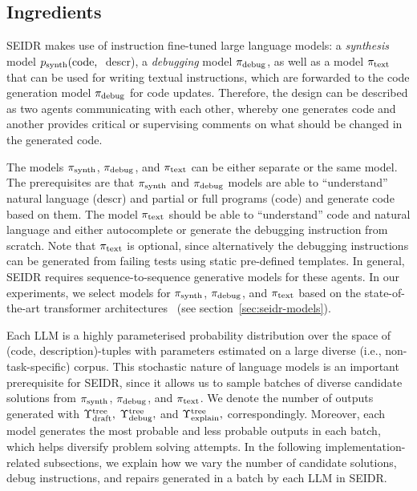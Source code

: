\newpage\subsection{Ingredients}
\label{sec:seidr-ingredients}

SEIDR makes use of instruction fine-tuned large language models: a \emph{synthesis} model $p_{\text{synth}}(\text{code, }$ descr), a \emph{debugging} model $ \pi_\text{debug} $, as well as a model $ \pi_\text{text} $ that can be used for writing textual instructions, which are forwarded to the code generation model $ \pi_\text{debug} $ for code updates. 
Therefore, the design can be described as two agents communicating with each other, whereby one generates code and another provides critical or supervising comments on what should be changed in the generated code. 

The models $ \pi_\text{synth} $, $ \pi_\text{debug} $, and $ \pi_\text{text} $ can be either separate or the same model.
The prerequisites are that $ \pi_\text{synth} $ and $ \pi_\text{debug} $ models are able to ``understand'' natural language (descr) and partial or full programs (code) and generate code based on them. 
The model $ \pi_\text{text} $ should be able to ``understand'' code and natural language and either autocomplete or generate the debugging instruction from scratch. 
Note that $ \pi_\text{text} $ is optional, since alternatively the debugging instructions can be generated from failing tests using static pre-defined templates.
In general, SEIDR requires sequence-to-sequence generative models for these agents. 
In our experiments, we select models for $ \pi_\text{synth} $, $ \pi_\text{debug} $, and $ \pi_\text{text} $ based on the state-of-the-art transformer architectures~\cite{vaswaniAttentionAllYou2023} 
(see section~\ref{sec:seidr-models}). 

Each LLM is a highly parameterised probability distribution over the space of (code, description)-tuples with parameters estimated on a large diverse (i.e., non-task-specific) corpus.
This stochastic nature of language models is an important prerequisite for SEIDR, since it allows us to sample batches of diverse candidate solutions from $ \pi_\text{synth} $, $ \pi_\text{debug} $, and $ \pi_\text{text} $. 
We denote the number of outputs generated with $\Upsilon^\text{tree}_\text{draft},$ $\Upsilon^\text{tree}_\text{debug},$ and $\Upsilon^\text{tree}_\text{explain},$ correspondingly.
Moreover, each model generates the most probable and less probable outputs in each batch, which helps diversify problem solving attempts. 
In the following implementation-related subsections, we explain how we vary the number of candidate solutions, debug instructions, and repairs generated in a batch by each LLM in SEIDR.

